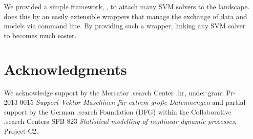 \documentclass[article, shortnames]{jss}
\begin{document}
We provided a simple framework, ,  to attach many SVM solvers to the  landscape.
 does this by an easily extensible wrappers that manage the exchange of data and models
via command line.
By providing such a wrapper, linking any SVM solver to  becomes much easier.



\section*{Acknowledgments}

We acknowledge support by the Mercator  .search Center  .hr,
under grant Pr-2013-0015 \textit{Support-Vektor-Maschinen f{\"u}r extrem gro{\ss}e Datenmengen} and
partial support by the German  .search Foundation (DFG) within the Collaborative  .search Centers SFB 823
\textit{Statistical modelling of nonlinear dynamic processes}, Project C2.



\end{document}
